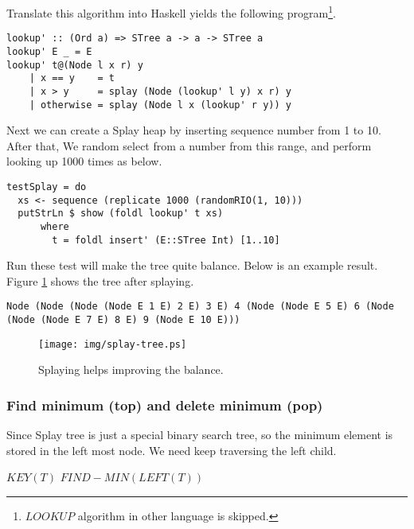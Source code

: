 \documentclass{article}
\begin{document}
Translate this algorithm into Haskell yields the following program\footnote{$LOOKUP$ algorithm in other language is skipped.}.

\lstset{language=Haskell}
\begin{lstlisting}
lookup' :: (Ord a) => STree a -> a -> STree a
lookup' E _ = E
lookup' t@(Node l x r) y
    | x == y    = t
    | x > y     = splay (Node (lookup' l y) x r) y
    | otherwise = splay (Node l x (lookup' r y)) y
\end{lstlisting}

Next we can create a Splay heap by inserting sequence number from
1 to 10. After that, We random select from a number from this range,
and perform looking up 1000 times as below.

\begin{lstlisting}
testSplay = do
  xs <- sequence (replicate 1000 (randomRIO(1, 10)))
  putStrLn $ show (foldl lookup' t xs)
      where
        t = foldl insert' (E::STree Int) [1..10]
\end{lstlisting} %

Run these test will make the tree quite balance. Below is an example
result. Figure \ref{fig:splay-result} shows the tree after splaying.

\begin{verbatim}
Node (Node (Node (Node E 1 E) 2 E) 3 E) 4 (Node (Node E 5 E) 6 (Node
(Node (Node E 7 E) 8 E) 9 (Node E 10 E)))
\end{verbatim}

\begin{figure}[htbp]
   \begin{center}
   	  \texttt{[image: img/splay-tree.ps]}
          \caption{Splaying helps improving the balance.} \label{fig:splay-result}
   \end{center}
\end{figure}


\subsubsection{Find minimum (top) and delete minimum (pop)}
Since Splay tree is just a special binary search tree, so the minimum
element is stored in the left most node. We need keep traversing
the left child.

\begin{algorithmic}[1]
    \State \Return $KEY(T)$
  \Else
    \State \Return $FIND-MIN(LEFT(T))$
  \EndIf
\EndFunction
\end{algorithmic}
\end{document}

